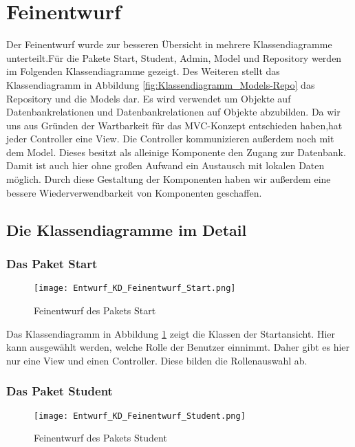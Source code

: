 \documentclass[a4paper,10pt]{article}
\begin{document}
  \newpage
\section{Feinentwurf}
Der Feinentwurf wurde zur besseren Übersicht in mehrere Klassendiagramme unterteilt.F\"ur die Pakete Start, Student, Admin, Model und Repository werden im Folgenden Klassendiagramme gezeigt.
Des Weiteren stellt das Klassendiagramm in Abbildung \ref{fig:Klassendiagramm_Models-Repo} das Repository und die Models dar. Es wird verwendet um Objekte auf Datenbankrelationen und Datenbankrelationen auf Objekte abzubilden. Da wir uns aus Gründen der Wartbarkeit für das MVC-Konzept entschieden haben,hat jeder Controller eine View.
Die Controller kommunizieren außerdem noch mit dem Model. Dieses besitzt als alleinige Komponente den Zugang zur Datenbank. Damit ist auch hier ohne großen Aufwand ein Austausch mit lokalen Daten möglich.
Durch diese Gestaltung der Komponenten haben wir außerdem eine bessere Wiederverwendbarkeit von Komponenten geschaffen. 

 \subsection{Die Klassendiagramme im Detail}
 \subsubsection{Das Paket Start}
 
 \begin{figure}
  \texttt{[image: Entwurf\_KD\_Feinentwurf\_Start.png]}
  \label{fig:Klassendiagramm_Start}
  \caption{Feinentwurf des Pakets Start}
 \end{figure} 
 
 Das Klassendiagramm in Abbildung \ref{fig:Klassendiagramm_Start} zeigt die Klassen der Startansicht. Hier kann ausgewählt werden, welche Rolle der Benutzer einnimmt. 
 Daher gibt es hier nur eine View und einen Controller. Diese bilden die Rollenauswahl ab.
 
 \subsubsection{Das Paket Student}
 
 \begin{figure}
\texttt{[image: Entwurf\_KD\_Feinentwurf\_Student.png]}
\label{fig:Klassendiagramm_Student}
\caption{Feinentwurf des Pakets Student}
 \end{figure} 
\end{document}
